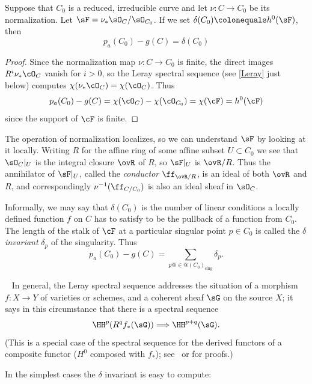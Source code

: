 \begin{proposition}\label{pa and delta}
Suppose that $C_{0}$ is a reduced, irreducible curve and let  $\nu: C\to C_{0}$ be its normalization.
Let $\sF = \nu_{*}\sO_{C}/\sO_{C_{0}}$. If we set 
$\delta(C_{0}) \colonequals h^{0}(\sF)$, 
then
 $$
p_a(C_0) - g(C) =  \delta(C_{0})
$$ 
\end{proposition}

\begin{proof}
 Since the normalization map $\nu: C \to C_0$ is finite,  the direct images $R^i\nu_*\cO_C$ vanish for $i > 0$, 
so the Leray spectral sequence 
(see \ref{Leray} just below)
computes $\chi(\nu_*\cO_C) = \chi(\cO_C)$. Thus
$$
p_a(C_0) - g(C) =  \chi(\cO_{C}) -   \chi(\cO_{C_0}) = \chi(\cF) = h^0(\cF) 
$$ 
since the support of $\cF$ is finite.
\end{proof}

The operation of normalization localizes, so we can understand $\sF$ by looking at it locally.
Writing $R$ for the affine ring of some affine subset $U\subset C_{0}$ we see that $\sO_{C}|_{U}$
is the integral closure $\ovR$ of $R$, so $\sF|_{U}$ is $\ovR/R$. Thus
the annihilator of $\sF|_{U}$, called the \emph{conductor}
$\ff_{\ovR/R}$,
is an ideal of both $\ovR$ and $R$,
and correspondingly $\nu^{-1}(\ff_{C/C_{0}})$ 
is also an ideal sheaf in $\sO_{C}$.

Informally, we may say that $\delta(C_{0})$ is the number of linear
conditions a locally defined function $f$ on $C$ has to satisfy to be
the pullback of a function from $C_0$. The length of the stalk of
$\cF$ at a particular singular point $p \in C_0$ is called the
%
\emph{$\delta$ invariant} $\delta_p$ of the singularity. Thus 
$$
p_a(C_0) - g(C) = \sum_{p @\in@ (C_0)_{\mathrm{sing}}\!\!} \delta_p.
$$ 

\begin{fact}~\label{Leray}
 In general, the 
Leray spectral sequence
%
addresses the situation of  a morphism $f:X\to Y$ of varieties or schemes, 
 and a coherent sheaf $\sG$  on the source $X$; it says in this circumstance that there is a spectral sequence
  $$
  \HH^p(R^qf_*(\sG)) \Longrightarrow \HH^{p+q}(\sG).
  $$
(This is a special case of the spectral sequence for the derived functors of a composite functor ($H^0$ composed with $f_*$);
see~\cite[II.4.17.1]{Godement} or \cite[Section III.7]{Gelfand-Manin} for proofs.)
\end{fact}

In the simplest cases the $\delta$ invariant is easy to compute:


